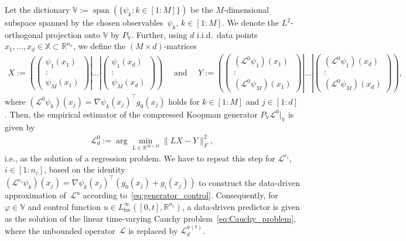 \documentclass{article}
\numberwithin{equation}{section}
\newcommand{\R}{\mathbb{R}}
\newcommand{\nx}{n_x}
\newcommand{\nc}{n_c}
\newcommand{\N}{M}
\renewcommand{\d}{d}
\newcommand{\calL}{\mathcal L}
\newcommand{\bX}{\mathbb X}
\begin{document}
	Let the dictionary $\mathbb{V} := \operatorname{span}(\{ \psi_k: k \in [1:\N]\} )$ be the $\N$-dimensional subspace spanned by the chosen observables~$\psi_k$, $k \in [1:\N]$. We denote the $L^2$-orthogonal projection onto $\mathbb{V}$ by $P_\mathbb{V}$. Further, using $\d$ i.i.d.\ data points $x_1,\ldots,x_{\d}\in \bX \subset \R^{\nx}$, we define the $(\N \times \d)$-matrices
	\begin{align*}
	X := \left( \left.   \left(\begin{smallmatrix}
	\psi_1(x_1)\\
	:\\
	\psi_{\N}(x_1)
	\end{smallmatrix}\right)\right| \ldots \left| \left(\begin{smallmatrix}
	\psi_1(x_{\d})\\
	:\\
	\psi_{\N}(x_{\d})
	\end{smallmatrix}\right)\right. \right)\quad\text{ and }\quad
	Y := \left( \left. \left(\begin{smallmatrix}
	(\mathcal{L}^0\psi_1)(x_1)\\
	:\\
	(\mathcal{L}^0\psi_{\N})(x_1)
	\end{smallmatrix}\right)\right| \ldots \left| \left(\begin{smallmatrix}
	(\mathcal{L}^0\psi_1)(x_{\d})\\
	:\\
	(\mathcal{L}^0\psi_{\N})(x_{\d})
	\end{smallmatrix}\right)\right. \right),
	\end{align*}
	where $(\mathcal{L}^0 \psi_k)(x_j) = \nabla \psi_k(x_j)^\top g_0(x_j)$ holds for $k \in [1:\N]$ and $j \in [1:\d]$. 
	Then, the empirical estimator of the compressed Koopman generator $P_\mathbb{V}\calL^0\vert_\mathbb{V}$ is given by
	\begin{align*}
	{\calL}^0_\d := \operatorname{arg}\min_{{L} \in \R^{\N\times \N}} \|{L}X-Y\|_F^2,
	\end{align*}
	i.e., as the solution of a regression problem. 
	We have to repeat this step for $\mathcal{L}^{e_i}$, $i \in [1:\nc]$, based on the identity $(\mathcal{L}^{e_i} \psi_k)(x_j) = \nabla \psi_k(x_j)^\top \left(g_0(x_j) + g_i(x_j)\right)$ to construct the data-driven approximation of~$\mathcal{L}^{u}$ according to~\eqref{eq:generator_control}. 
	Consequently, for $\varphi \in \mathbb{V}$ and control function $u \in L^\infty_{\operatorname{loc}}([0,t],\R^{\nc})$, a data-driven predictor is given as the solution of the linear time-varying Cauchy problem~\eqref{eq:Cauchy_problem}, where the unbounded operator~$\mathcal{L}$ is replaced by $\calL_d^{u(t)}$. 
\end{document}
